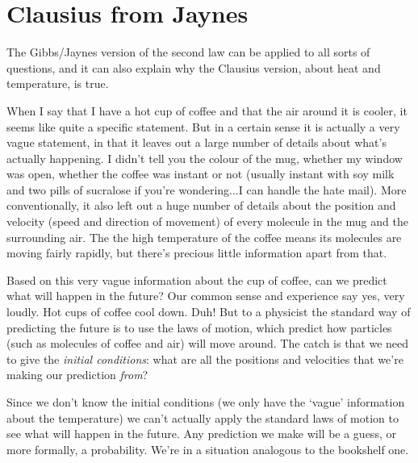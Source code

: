 \documentclass[a4paper, 12pt]{article}
\begin{document}

\section*{Clausius from Jaynes}
The Gibbs/Jaynes version of the second law can be applied to all sorts of
questions, and it can also explain why the Clausius version, about heat and
temperature, is true. 

When I say that I have a hot cup of coffee and that the air around it is cooler,
it seems like quite a specific statement. But in a certain sense it is actually
a very vague statement, in that it leaves out a large number of details about
what's actually happening. I didn't tell you the colour of the mug, whether
my window was open, whether the coffee was instant or not (usually instant with
soy milk and two pills of sucralose if you're wondering...I can handle the hate mail). More conventionally, it also left out a huge number of details about the position and
velocity (speed and direction of movement) of every molecule in the mug and
the surrounding air. The the high temperature of the coffee means its
molecules are moving fairly rapidly, but there's precious little information
apart from that.

Based on this very vague information about the cup of coffee, can we predict
what will happen in the future? Our common sense and experience say yes, very
loudly. Hot cups of coffee cool down. Duh!
But to a physicist the standard way of predicting the future is to use
the laws of motion, which predict how particles (such as molecules of coffee
and air) will move around. The catch is that we need to give the {\it initial
conditions}: what are all the positions and velocities that we're making our
prediction {\it from}?

Since we don't know the initial conditions (we only have the `vague' information
about the temperature) we can't actually apply the standard laws of motion to
see what will happen in the future. Any prediction we make will be a
guess, or more formally, a probability. We're in a situation analogous to the
bookshelf one. 
\end{document}
